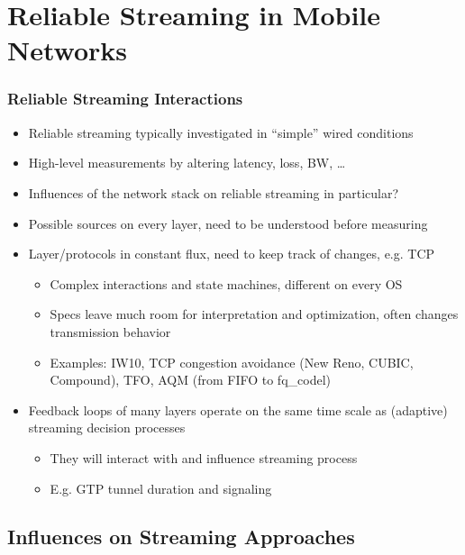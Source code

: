 \documentclass{beamer}
\begin{document}
\section{Reliable Streaming in Mobile Networks}


\begin{frame}
	\frametitle{Reliable Streaming Interactions}

	\begin{itemize}
		\item Reliable streaming typically investigated in ``simple'' wired conditions
		\item High-level measurements by altering latency, loss, BW, \ldots
		\item Influences of the network stack on reliable streaming in particular?
		\item Possible sources on every layer, need to be understood before measuring
	\end{itemize}

	\begin{itemize}[<2->]
		\item Layer/protocols in constant flux, need to keep track of changes, e.g. TCP
		\begin{itemize}
			\item Complex interactions and state machines, different on every OS
			\item Specs leave much room for interpretation and optimization, often changes transmission behavior
			\item Examples: IW10, TCP congestion avoidance (New Reno, CUBIC, Compound), TFO, AQM (from FIFO to fq\_codel)
		\end{itemize}
		\item Feedback loops of many layers operate on the same time scale as (adaptive) streaming decision processes
		\begin{itemize}
			\item They will interact with and influence streaming process
			\item E.g. GTP tunnel duration and signaling
		\end{itemize}
	\end{itemize}
\end{frame}


\subsection{Influences on Streaming Approaches}
\end{document}
